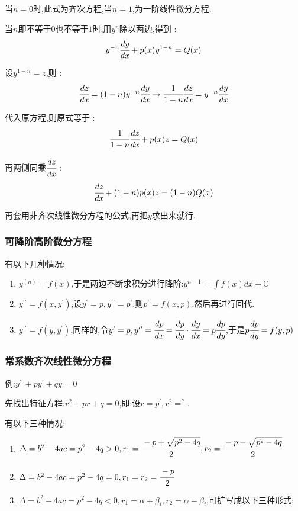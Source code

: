 \documentclass[UTF8,12pt]{ctexbook}
\newcommand{\derivative}{^\prime}
\newcommand{\doubleDerivative}{^{\prime\prime}}
\newcommand{\defFunction}[1]{f(#1)}
\newcommand{\mathConstant}{\mathbb{C}}
\begin{document}
{{{{  当$n = 0$时,此式为齐次方程,当$n = 1$,为一阶线性微分方程.

  当$n$即不等于$0$也不等于$1$时,用$y^n$除以两边,得到 :
  $$
    y^{-n}\cfrac{dy}{dx} + p(x)y^{1 - n} = Q(x)
  $$

  设$y^{1 - n} = z$,则 :
  $$
    \cfrac{dz}{dx} = (1 - n)y^{-n}\cfrac{dy}{dx} \to \cfrac{1}{1 - n}\cfrac{dz}{dx} = y^{-n}\cfrac{dy}{dx}
  $$

  代入原方程,则原式等于 :
  $$
    \cfrac{1}{1 - n}\cfrac{dz}{dx} + p(x)z = Q(x)
  $$

  再两侧同乘$\cfrac{dz}{dx}$ :
  $$
    \cfrac{dz}{dx} + (1 - n)p(x)z = (1 - n)Q(x)
  $$

  再套用非齐次线性微分方程的公式,再把$y$求出来就行.
}%

\subsubsection{可降阶高阶微分方程}{
  有以下几种情况:

  \begin{enumerate}
    \item $y^{(n)} = \defFunction{x}$,于是两边不断求积分进行降阶:$y^{n-1} = \int \defFunction{x}dx + \mathConstant$
    \item $y\doubleDerivative = \defFunction{x,y\derivative}$,设$y\derivative = p,y\doubleDerivative = p\derivative$,则$p\derivative = \defFunction{x,p}$.然后再进行回代.
    \item $y\doubleDerivative = \defFunction{y,y\derivative}$,同样的,令$y\derivative = p, y\doubleDerivative = \cfrac{dp}{dx} = \cfrac{dp}{dy}\cdot\cfrac{dy}{dx} = p\cfrac{dp}{dy}$,于是$p\cfrac{dp}{dy} = \defFunction{y,p}$
  \end{enumerate}

}%

\subsubsection{常系数齐次线性微分方程}{
  例:$y\doubleDerivative + py\derivative + qy = 0$

  先找出特征方程:$r^2 + pr + q = 0$,即:设$r = p\derivative,r^2 = \doubleDerivative$.

  有以下三种情况:
  \begin{enumerate}
    \item $\Delta = b^2 - 4ac = p^2 - 4q > 0,r_1 = \cfrac{-p + \sqrt{p^2 - 4q}}{2}, r_2 = \cfrac{-p - \sqrt{p^2 - 4q}}{2}$
    \item $\Delta = b^2 - 4ac = p^2 - 4q = 0,r_1 = r_2 = \cfrac{-p}{2}$
    \item {$\Delta = b^2 - 4ac = p^2 - 4q < 0,r_1 = \alpha + \beta_i, r_2 = \alpha - \beta_i$,可扩写成以下三种形式:

}
\end{enumerate}}}}}
\end{document}
